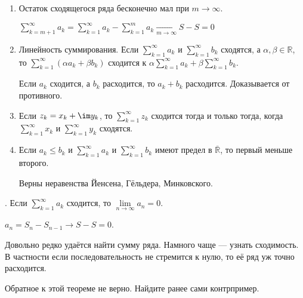 \documentclass{article}
\begin{document}
\begin{itemize}
        \begin{enumerate}
            \addtocounter{enumi}{1}
            \item Остаток сходящегося ряда бесконечно мал при $m\to\infty$.
            \begin{Proof}
                $\sum\limits_{k=m+1}^\infty a_k=\sum\limits_{k=1}^\infty a_k-\sum\limits_{k=1}^m a_k\underset{m\to\infty}\rightarrow S-S=0$
            \end{Proof}
            \item Линейность суммирования.
            Если $\sum\limits_{k=1}^\infty a_k$ и $\sum\limits_{k=1}^\infty b_k$ сходятся, а $\alpha,\beta\in\mathbb R$, то $\sum\limits_{k=1}^\infty(\alpha a_k+\beta b_k)$ сходится к $\alpha\sum\limits_{k=1}^\infty a_k+\beta\sum\limits_{k=1}^\infty b_k$.
            \begin{Comment}
                Если $a_k$ сходится, а $b_k$ расходится, то $a_k+b_k$ расходится. Доказывается от противного.
            \end{Comment}
            \item Если $z_k=x_k+\im y_k$, то $\sum\limits_{k=1}^\infty z_k$ сходится тогда и только тогда, когда $\sum\limits_{k=1}^\infty x_k$ и $\sum\limits_{k=1}^\infty y_k$ сходятся.
            \item Если $a_k\leqslant b_k$ и $\sum\limits_{k=1}^\infty a_k$ и $\sum\limits_{k=1}^\infty b_k$ имеют предел в $\overline{\mathbb R}$, то первый меньше второго.
            \begin{Comment}
                Верны неравенства Йенсена, Гёльдера, Минковского.
            \end{Comment}
        \end{enumerate}
        \thm {}. Если $\sum\limits_{k=1}^\infty a_k$ сходится, то $\lim\limits_{n\to\infty}a_n=0$.
        \begin{Proof}
            $a_n=S_{n}-S_{n-1}\rightarrow S-S=0$.
        \end{Proof}
        \begin{Comment}
            Довольно редко удаётся найти сумму ряда. Намного чаще --- узнать сходимость. В частности если последовательность не стремится к нулю, то её ряд уж точно расходится.
        \end{Comment}
        \begin{Comment}
            Обратное к этой теореме не верно. Найдите ранее сами контрпример.
        \end{Comment}

\end{itemize}
\end{document}

